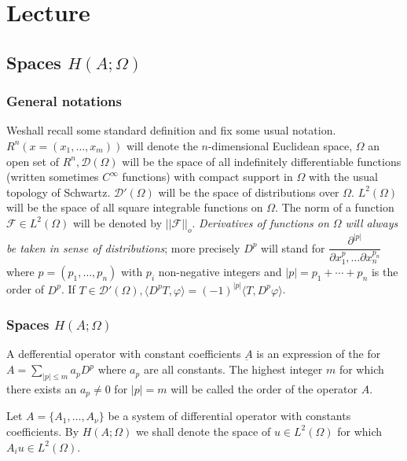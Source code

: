\chapter{Lecture}\label{lec1}%

\section{Spaces \texorpdfstring{$H(A; \Omega)$}{H(AOmega)}}\label{lec1:sec1}%

\subsection{General notations}\label{lec1:sec1:subsec1} 
We\pageoriginale shall recall some standard definition and fix
some usual 
  notation. $R^n(x=(x_1, \ldots , x_m))$ will denote the
  $n$-dimensional Euclidean space, $\Omega$ an open set of $R^n,
  \mathscr{D}(\Omega)$ will be the space of all indefinitely
  differentiable functions (written sometimes $C^ \infty$ functions)
  with compact support in $\Omega$ with the usual topology of
  Schwartz. $\mathscr{D'}(\Omega)$ will be the space of distributions
  over $\Omega$. $L^2(\Omega)$ will be the space of all square
  integrable functions on $\Omega$. The norm of a function
  $\mathscr{F}\in L^2 (\Omega)$ will be denoted by $||
  \mathscr{F} ||_o$. \textit{Derivatives of functions on $\Omega$ will
  always be taken in sense of distributions}; more precisely $D^p$
  will stand for $\dfrac{\partial ^{|p|}}{\partial x^p_1, \ldots
  \partial x^{p_n}_{n}}$ where $p=(p_1, \ldots ,p_n)$ with
  $p_i$ non-negative integers and $|p|=p_1 + \cdots + p_n$ is the
  order of $D^p$. If $T \in \mathscr{D}' (\Omega), \langle
  D^pT, \varphi \rangle = (-1)^{|p|} \langle T,D^p \varphi
  \rangle$. 

\subsection{Spaces \texorpdfstring{${H(A;\Omega)}$}{H(AOmega)}}\label{lec1:sec1:subsec2} 

A defferential operator with constant coefficients $\underbar{A}$ is
an expression of the for $A= \sum\limits _{|p| \le m} a_p D^p$ where
$a_p$ are all constants. The highest integer $m$ for which there
exists an $a_p \neq 0$ for $|p|=m$ will be called the order of the
operator $A$. 
   \begin{definition}\label{lec1:sec1:subsec2:def1.1} %
     Let $A= \{ A_1 , \ldots , A_\nu \}$ be a system of differential
     operator with constants coefficients. By $H(A; \Omega)$ we shall
     denote the space of $u \in L^2(\Omega)$ for which $A_i u
     \in L^2 (\Omega)$. 
   \end{definition}

